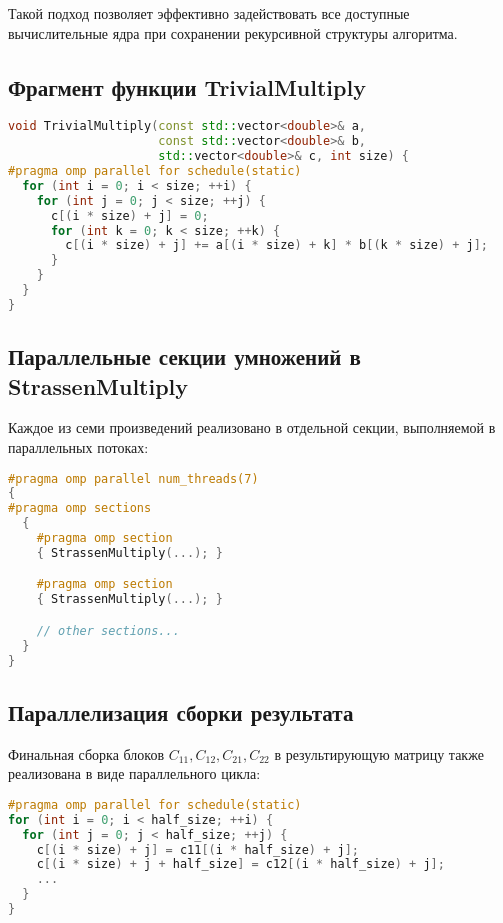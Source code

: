 \documentclass[14pt,a4paper]{extarticle}
\begin{document}
Такой подход позволяет эффективно задействовать все доступные вычислительные ядра при сохранении рекурсивной структуры алгоритма.

\subsection*{Фрагмент функции TrivialMultiply}

\begin{lstlisting}[language=C++]
void TrivialMultiply(const std::vector<double>& a,
                     const std::vector<double>& b,
                     std::vector<double>& c, int size) {
#pragma omp parallel for schedule(static)
  for (int i = 0; i < size; ++i) {
    for (int j = 0; j < size; ++j) {
      c[(i * size) + j] = 0;
      for (int k = 0; k < size; ++k) {
        c[(i * size) + j] += a[(i * size) + k] * b[(k * size) + j];
      }
    }
  }
}
\end{lstlisting}

\subsection*{Параллельные секции умножений в StrassenMultiply}

Каждое из семи произведений реализовано в отдельной секции, выполняемой в параллельных потоках:

\begin{lstlisting}[language=C++]
#pragma omp parallel num_threads(7)
{
#pragma omp sections
  {
    #pragma omp section
    { StrassenMultiply(...); }

    #pragma omp section
    { StrassenMultiply(...); }

    // other sections...
  }
}
\end{lstlisting}

\subsection*{Параллелизация сборки результата}

Финальная сборка блоков $C_{11}, C_{12}, C_{21}, C_{22}$ в результирующую матрицу также реализована в виде параллельного цикла:

\begin{lstlisting}[language=C++]
#pragma omp parallel for schedule(static)
for (int i = 0; i < half_size; ++i) {
  for (int j = 0; j < half_size; ++j) {
    c[(i * size) + j] = c11[(i * half_size) + j];
    c[(i * size) + j + half_size] = c12[(i * half_size) + j];
    ...
  }
}
\end{lstlisting}
\end{document}
